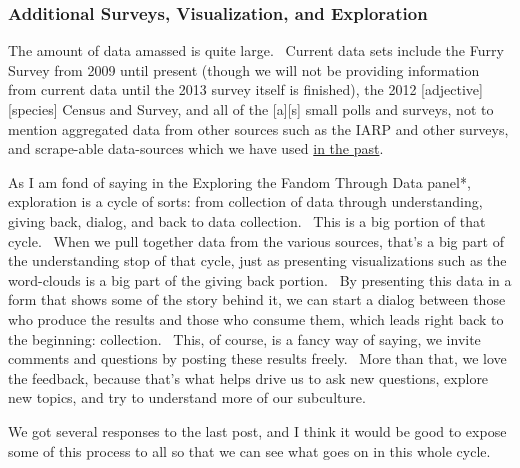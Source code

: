 \subsubsection{Additional Surveys, Visualization, and
Exploration}\label{additional-surveys-visualization-and-exploration}

The amount of data amassed is quite large. ~Current data sets include
the Furry Survey from 2009 until present (though we will not be
providing information from current data until the 2013 survey itself is
finished), the 2012 {[}adjective{]}{[}species{]} Census and Survey, and
all of the {[}a{]}{[}s{]} small polls and surveys, not to mention
aggregated data from other sources such as the IARP and other surveys,
and scrape-able data-sources which we have used
\href{http://vis.adjectivespecies.com/furrysurvey/extras/}{in the past}.

As I am fond of saying in the Exploring the Fandom Through Data panel*,
exploration is a cycle of sorts: from collection of data through
understanding, giving back, dialog, and back to data collection. ~This
is a big portion of that cycle. ~When we pull together data from the
various sources, that's a big part of the understanding stop of that
cycle, just as presenting visualizations such as the word-clouds is a
big part of the giving back portion. ~By presenting this data in a form
that shows some of the story behind it, we can start a dialog between
those who produce the results and those who consume them, which leads
right back to the beginning: collection. ~This, of course, is a fancy
way of saying, we invite comments and questions by posting these results
freely. ~More than that, we love the feedback, because that's what helps
drive us to ask new questions, explore new topics, and try to understand
more of our subculture.

We got several responses to the last post, and I think it would be good
to expose some of this process to all so that we can see what goes on in
this whole cycle.

